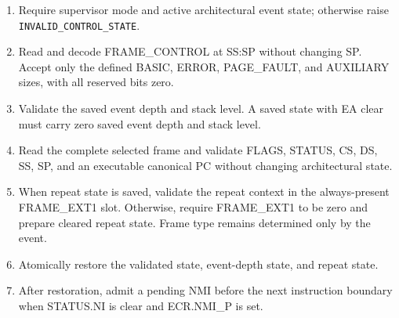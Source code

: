 {\raggedright
\begin{enumerate}
\item Require supervisor mode and active architectural event state; otherwise raise \texttt{INVALID\_CONTROL\_STATE}.
\item Read and decode FRAME\_CONTROL at SS:SP without changing SP. Accept only the defined BASIC, ERROR, PAGE\_FAULT, and AUXILIARY sizes, with all reserved bits zero.
\item Validate the saved event depth and stack level. A saved state with EA clear must carry zero saved event depth and stack level.
\item Read the complete selected frame and validate FLAGS, STATUS, CS, DS, SS, SP, and an executable canonical PC without changing architectural state.
\item When repeat state is saved, validate the repeat context in the always-present FRAME\_EXT1 slot. Otherwise,
require FRAME\_EXT1 to be zero and prepare cleared repeat state. Frame type remains determined only by the event.
\item Atomically restore the validated state, event-depth state, and repeat state.
\item After restoration, admit a pending NMI before the next instruction boundary when STATUS.NI is clear and ECR.NMI\_P is set.
\end{enumerate}
\par}
